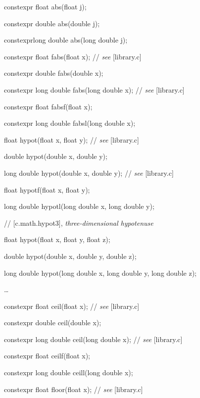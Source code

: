 \documentclass[prd,twocolumn,amsmath,amssymb,nofootinbib,eqsecnum]{revtex4-1}
\newcommand{\highlight}[1]{{\color{green} #1}}
\newcommand{\stdcomment}[1]{{// {\it see} [#1]}}
\begin{document}
{\highlight{constexpr} float abs(float j);

\highlight{constexpr} double abs(double j);

\highlight{constexpr}long double abs(long double j);

\vspace{2ex}

\highlight{constexpr} float fabs(float x); \stdcomment{library.c}

\highlight{constexpr} double fabs(double x);

\highlight{constexpr} long double fabs(long double x); \stdcomment{library.c}

\highlight{constexpr} float fabsf(float x);

\highlight{constexpr} long double fabsl(long double x);

\vspace{2ex}

float hypot(float x, float y); \stdcomment{library.c}

double hypot(double x, double y);

long double hypot(double x, double y); \stdcomment{library.c}

float hypotf(float x, float y);

long double hypotl(long double x, long double y);

\vspace{2ex}

// [c.math.hypot3], {\it three-dimensional hypotenuse}

float hypot(float x, float y, float z);

double hypot(double x, double y, double z);

long double hypot(long double x, long double y, long double z);

\vspace{2ex}
\ldots
\vspace{2ex}

\highlight{constexpr} float ceil(float x); \stdcomment{library.c}

\highlight{constexpr} double ceil(double x);

\highlight{constexpr} long double ceil(long double x); \stdcomment{library.c}

\highlight{constexpr} float ceilf(float x);

\highlight{constexpr} long double ceill(long double x);

\vspace{2ex}

\highlight{constexpr} float floor(float x); \stdcomment{library.c}

}
\end{document}
